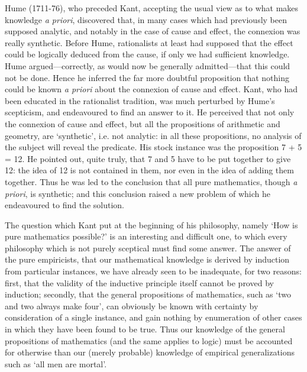 \documentclass[oneside,letterpaper,12pt]{book}
\begin{document}
Hume (1711-76), who preceded Kant, accepting the usual view as to what
makes knowledge \emph{a priori}, discovered that, in many cases which
had previously been supposed analytic, and notably in the case of cause
and effect, the connexion was really synthetic. Before Hume,
rationalists at least had supposed that the effect could be logically
deduced from the cause, if only we had sufficient knowledge. Hume
argued---correctly, as would now be generally admitted---that this could
not be done. Hence he inferred the far more doubtful proposition that
nothing could be known \emph{a priori} about the connexion of cause and
effect. Kant, who had been educated in the rationalist tradition, was
much perturbed by Hume's scepticism, and endeavoured to
find an answer to it. He perceived that not only the connexion of cause
and effect, but all the propositions of arithmetic and geometry, are
`synthetic', i.e. not analytic: in all
these propositions, no analysis of the subject will reveal the
predicate. His stock instance was the proposition 7 + 5 = 12. He pointed
out, quite truly, that 7 and 5 have to be put together to give 12: the
idea of 12 is not contained in them, nor even in the idea of adding them
together. Thus he was led to the conclusion that all pure mathematics,
though \emph{a priori}, is synthetic; and this conclusion raised a new
problem of which he endeavoured to find the solution.

The question which Kant put at the beginning of his philosophy, namely
`How is pure mathematics possible?' is
an interesting and difficult one, to which every philosophy which is not
purely sceptical must find some answer. \label{instances} The answer of the pure
empiricists, that our mathematical knowledge is derived by induction
from particular instances, we have already seen to be inadequate, for
two reasons: first, that the validity of the inductive principle itself
cannot be proved by induction; secondly, that the general propositions
of mathematics, such as `two and two always make
four', can obviously be known with certainty by
consideration of a single instance, and gain nothing by enumeration of
other cases in which they have been found to be true. Thus our knowledge
of the general propositions of mathematics (and the same applies to
logic) must be accounted for otherwise than our (merely probable)
knowledge of empirical generalizations such as `all men
are mortal'.
\end{document}
